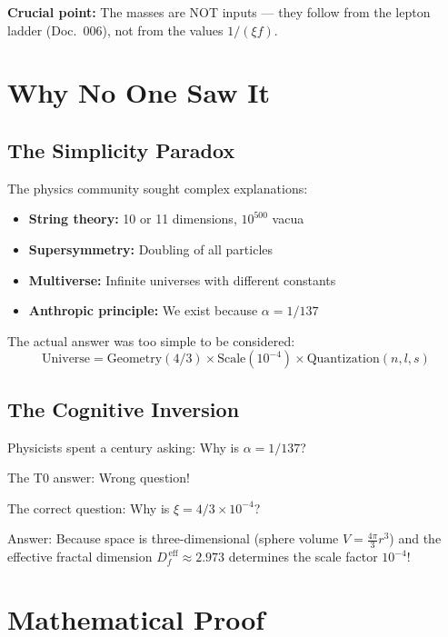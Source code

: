 	\textbf{Crucial point:} The masses are NOT inputs — they follow from the lepton ladder (Doc.~006), not from the values $1/(\xi f)$.
	
	\section{Why No One Saw It}
	
	\subsection{The Simplicity Paradox}
	
	The physics community sought complex explanations:
	
	\begin{itemize}
		\item \textbf{String theory:} 10 or 11 dimensions, $10^{500}$ vacua
		\item \textbf{Supersymmetry:} Doubling of all particles
		\item \textbf{Multiverse:} Infinite universes with different constants
		\item \textbf{Anthropic principle:} We exist because $\alpha = 1/137$
	\end{itemize}
	
	The actual answer was too simple to be considered:
	\begin{equation}
		\boxed{\text{Universe} = \text{Geometry}(4/3) \times \text{Scale}(10^{-4}) \times \text{Quantization}(n,l,s)}
	\end{equation}
	
	\subsection{The Cognitive Inversion}
	
	\begin{tcolorbox}[colback=purple!5!white,colframe=purple!75!black,title=Discovery]
		Physicists spent a century asking: Why is $\alpha = 1/137$?
		
		The T0 answer: Wrong question!
		
		The correct question: Why is $\xi = 4/3 \times 10^{-4}$?
		
		Answer: Because space is three-dimensional (sphere volume $V = \frac{4\pi}{3} r^3$) and the effective fractal dimension $D_f^{\,\text{eff}} \approx 2.973$ determines the scale factor $10^{-4}$!
	\end{tcolorbox}
	
	\section{Mathematical Proof}
	
